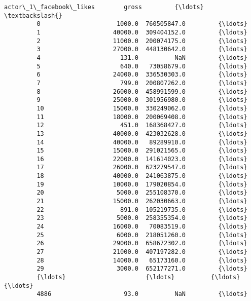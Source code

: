 \documentclass[11pt]{article}
\begin{document}
\begin{Verbatim}[commandchars=\\\{\}]
               actor\_1\_facebook\_likes        gross         {\ldots}           \textbackslash{}
         0                     1000.0  760505847.0         {\ldots}            
         1                    40000.0  309404152.0         {\ldots}            
         2                    11000.0  200074175.0         {\ldots}            
         3                    27000.0  448130642.0         {\ldots}            
         4                      131.0          NaN         {\ldots}            
         5                      640.0   73058679.0         {\ldots}            
         6                    24000.0  336530303.0         {\ldots}            
         7                      799.0  200807262.0         {\ldots}            
         8                    26000.0  458991599.0         {\ldots}            
         9                    25000.0  301956980.0         {\ldots}            
         10                   15000.0  330249062.0         {\ldots}            
         11                   18000.0  200069408.0         {\ldots}            
         12                     451.0  168368427.0         {\ldots}            
         13                   40000.0  423032628.0         {\ldots}            
         14                   40000.0   89289910.0         {\ldots}            
         15                   15000.0  291021565.0         {\ldots}            
         16                   22000.0  141614023.0         {\ldots}            
         17                   26000.0  623279547.0         {\ldots}            
         18                   40000.0  241063875.0         {\ldots}            
         19                   10000.0  179020854.0         {\ldots}            
         20                    5000.0  255108370.0         {\ldots}            
         21                   15000.0  262030663.0         {\ldots}            
         22                     891.0  105219735.0         {\ldots}            
         23                    5000.0  258355354.0         {\ldots}            
         24                   16000.0   70083519.0         {\ldots}            
         25                    6000.0  218051260.0         {\ldots}            
         26                   29000.0  658672302.0         {\ldots}            
         27                   21000.0  407197282.0         {\ldots}            
         28                   14000.0   65173160.0         {\ldots}            
         29                    3000.0  652177271.0         {\ldots}            
         {\ldots}                      {\ldots}          {\ldots}         {\ldots}            
         4886                    93.0          NaN         {\ldots}            

\end{Verbatim}
\end{document}
